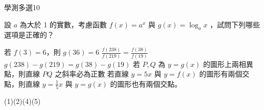     \begin{QUESTION}
        \begin{ExamInfo}{96}{學測}{多選}{10}
        \end{ExamInfo}
        \begin{ExamAnsRateInfo}{28}{52}{21}{11}
        \end{ExamAnsRateInfo}
        \begin{QBODY}
            設 $a$ 為大於 1 的實數，考慮函數 $f (x) = a^x$ 與 $g(x) = \log_a x$ ，試問下列哪些選項是正確的？ 
			\begin{QOPS} 
				\QOP 若 $f(3)=6$，則 $g(36)=6$ 
				\QOP $\frac{f (238)}{f(219)} = \frac{f (38)}{ f (19)}$ 
				\QOP $g(238)-g(219)= g(38)-g(19)$ 
				\QOP  若 $P, Q$ 為 $y = g(x)$ 的圖形上兩相異點，則直線 $PQ$ 之斜率必為正數 
				\QOP 若直線 $y=5x$ 與 $y= f(x)$ 的圖形有兩個交點，則直線 $y = \frac{1}{5}x$ 與 $y=g(x)$ 的圖形也有兩個交點。
			\end{QOPS}
        \end{QBODY}
        \begin{QFROMS}
        \end{QFROMS}
        \begin{QTAGS}\end{QTAGS}
        \begin{QANS}
            (1)(2)(4)(5)
        \end{QANS}
        \begin{QSOLLIST}
        \end{QSOLLIST}
        \begin{QEMPTYSPACE}
        \end{QEMPTYSPACE}
    \end{QUESTION}
